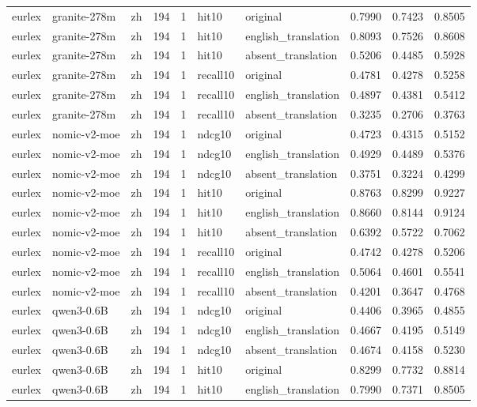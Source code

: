 \begin{tabular}{lllrrllrrr}
eurlex & granite-278m & zh & 194 & 1 & hit10 & original & 0.7990 & 0.7423 & 0.8505 \\
eurlex & granite-278m & zh & 194 & 1 & hit10 & english\_translation & 0.8093 & 0.7526 & 0.8608 \\
eurlex & granite-278m & zh & 194 & 1 & hit10 & absent\_translation & 0.5206 & 0.4485 & 0.5928 \\
eurlex & granite-278m & zh & 194 & 1 & recall10 & original & 0.4781 & 0.4278 & 0.5258 \\
eurlex & granite-278m & zh & 194 & 1 & recall10 & english\_translation & 0.4897 & 0.4381 & 0.5412 \\
eurlex & granite-278m & zh & 194 & 1 & recall10 & absent\_translation & 0.3235 & 0.2706 & 0.3763 \\
eurlex & nomic-v2-moe & zh & 194 & 1 & ndcg10 & original & 0.4723 & 0.4315 & 0.5152 \\
eurlex & nomic-v2-moe & zh & 194 & 1 & ndcg10 & english\_translation & 0.4929 & 0.4489 & 0.5376 \\
eurlex & nomic-v2-moe & zh & 194 & 1 & ndcg10 & absent\_translation & 0.3751 & 0.3224 & 0.4299 \\
eurlex & nomic-v2-moe & zh & 194 & 1 & hit10 & original & 0.8763 & 0.8299 & 0.9227 \\
eurlex & nomic-v2-moe & zh & 194 & 1 & hit10 & english\_translation & 0.8660 & 0.8144 & 0.9124 \\
eurlex & nomic-v2-moe & zh & 194 & 1 & hit10 & absent\_translation & 0.6392 & 0.5722 & 0.7062 \\
eurlex & nomic-v2-moe & zh & 194 & 1 & recall10 & original & 0.4742 & 0.4278 & 0.5206 \\
eurlex & nomic-v2-moe & zh & 194 & 1 & recall10 & english\_translation & 0.5064 & 0.4601 & 0.5541 \\
eurlex & nomic-v2-moe & zh & 194 & 1 & recall10 & absent\_translation & 0.4201 & 0.3647 & 0.4768 \\
eurlex & qwen3-0.6B & zh & 194 & 1 & ndcg10 & original & 0.4406 & 0.3965 & 0.4855 \\
eurlex & qwen3-0.6B & zh & 194 & 1 & ndcg10 & english\_translation & 0.4667 & 0.4195 & 0.5149 \\
eurlex & qwen3-0.6B & zh & 194 & 1 & ndcg10 & absent\_translation & 0.4674 & 0.4158 & 0.5230 \\
eurlex & qwen3-0.6B & zh & 194 & 1 & hit10 & original & 0.8299 & 0.7732 & 0.8814 \\
eurlex & qwen3-0.6B & zh & 194 & 1 & hit10 & english\_translation & 0.7990 & 0.7371 & 0.8505 \\

\end{tabular}

